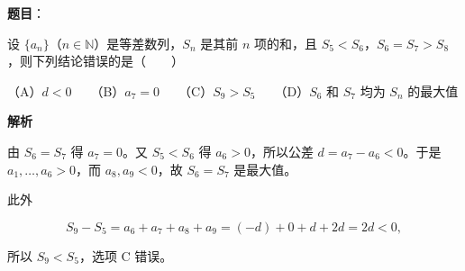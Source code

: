 \begin{answer}

\textbf{题目}：

设 $\{a_n\}$（$n\in\mathbb N$）是等差数列，$S_n$ 是其前 $n$ 项的和，且 $S_5<S_6$，$S_6=S_7>S_8$，则下列结论错误的是\mbox{（　　）}

（A）$d<0$　　（B）$a_7=0$　　（C）$S_9>S_5$　　（D）$S_6$ 和 $S_7$ 均为 $S_n$ 的最大值

\textbf{解析}

由 $S_6=S_7$ 得 $a_7=0$。又 $S_5<S_6$ 得 $a_6>0$，所以公差 $d=a_7-a_6<0$。于是 $a_1,\ldots,a_6>0$，而 $a_8,a_9<0$，故 $S_6=S_7$ 是最大值。

此外

\nopagebreak[4]
\[
S_9-S_5=a_6+a_7+a_8+a_9
=(-d)+0+d+2d=2d<0,
\]

所以 $S_9<S_5$，选项 C 错误。


\end{answer}

